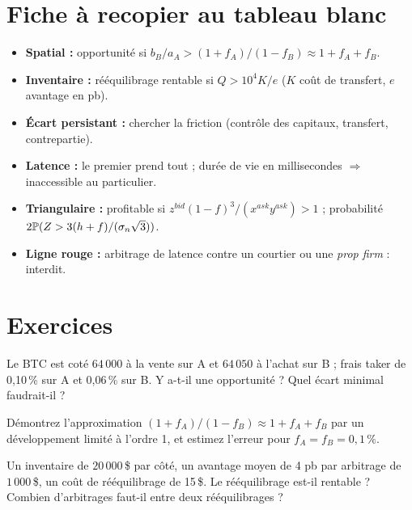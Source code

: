 \section{Fiche à recopier au tableau blanc}

\begin{whiteboard}
\begin{itemize}[leftmargin=1.2em]
\item \textbf{Spatial :} opportunité si $b_B/a_A > (1+f_A)/(1-f_B)\approx1+f_A+f_B$.
\item \textbf{Inventaire :} rééquilibrage rentable si $Q > 10^4K/e$ ($K$ coût de transfert, $e$ avantage en pb).
\item \textbf{Écart persistant :} chercher la friction (contrôle des capitaux, transfert, contrepartie).
\item \textbf{Latence :} le premier prend tout ; durée de vie en millisecondes $\Rightarrow$ inaccessible au particulier.
\item \textbf{Triangulaire :} profitable si $z^{bid}(1-f)^3/(x^{ask}y^{ask}) > 1$ ; probabilité $2\mathbb{P}(Z > 3(h+f)/(\sigma_n\sqrt3))$.
\item \textbf{Ligne rouge :} arbitrage de latence contre un courtier ou une \emph{prop firm} : interdit.
\end{itemize}
\end{whiteboard}

\section{Exercices}

\begin{exercise}
Le BTC est coté $64\,000$ à la vente sur A et $64\,050$ à l'achat sur B ; frais taker de 0,10\,\% sur A et 0,06\,\% sur B. Y a-t-il une opportunité ? Quel écart minimal faudrait-il ?
\end{exercise}

\begin{exercise}
Démontrez l'approximation $(1+f_A)/(1-f_B)\approx 1+f_A+f_B$ par un développement limité à l'ordre 1, et estimez l'erreur pour $f_A = f_B = 0{,}1\,\%$.
\end{exercise}

\begin{exercise}
Un inventaire de $20\,000$\,\$ par côté, un avantage moyen de 4 pb par arbitrage de $1\,000$\,\$, un coût de rééquilibrage de 15\,\$. Le rééquilibrage est-il rentable ? Combien d'arbitrages faut-il entre deux rééquilibrages ?
\end{exercise}

